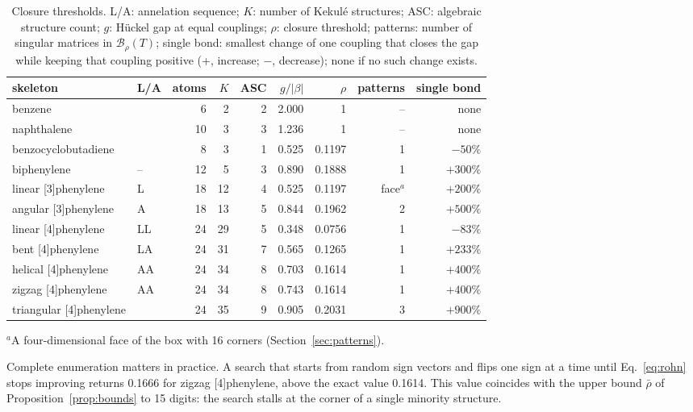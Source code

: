 \documentclass[11pt]{article}
\newcommand{\Bx}{\mathcal{B}}
\begin{document}
\begin{table}[t]
\centering
\caption{Closure thresholds. L/A: annelation sequence; $K$: number of Kekul\'e structures; ASC: algebraic structure count; $g$: H\"uckel gap at equal couplings; $\rho$: closure threshold; patterns: number of singular matrices in $\Bx_\rho(T)$; single bond: smallest change of one coupling that closes the gap while keeping that coupling positive (+, increase; $-$, decrease); none if no such change exists.}
\label{tab:rho}
\begin{tabular}{llrrrrrrr}
\toprule
skeleton & L/A & atoms & $K$ & ASC & $g/|\beta|$ & $\rho$ & patterns & single bond \\
\midrule
benzene & & 6 & 2 & 2 & 2.000 & 1 & -- & none \\
naphthalene & & 10 & 3 & 3 & 1.236 & 1 & -- & none \\
benzocyclobutadiene & & 8 & 3 & 1 & 0.525 & 0.1197 & 1 & $-50\%$ \\
biphenylene & -- & 12 & 5 & 3 & 0.890 & 0.1888 & 1 & $+300\%$ \\
linear [3]phenylene & L & 18 & 12 & 4 & 0.525 & 0.1197 & face$^{a}$ & $+200\%$ \\
angular [3]phenylene & A & 18 & 13 & 5 & 0.844 & 0.1962 & 2 & $+500\%$ \\
linear [4]phenylene & LL & 24 & 29 & 5 & 0.348 & 0.0756 & 1 & $-83\%$ \\
bent [4]phenylene & LA & 24 & 31 & 7 & 0.565 & 0.1265 & 1 & $+233\%$ \\
helical [4]phenylene & AA & 24 & 34 & 8 & 0.703 & 0.1614 & 1 & $+400\%$ \\
zigzag [4]phenylene & AA & 24 & 34 & 8 & 0.743 & 0.1614 & 1 & $+400\%$ \\
triangular [4]phenylene & & 24 & 35 & 9 & 0.905 & 0.2031 & 3 & $+900\%$ \\
\bottomrule
\end{tabular}

\smallskip
{\footnotesize $^{a}$A four-dimensional face of the box with 16 corners (Section~\ref{sec:patterns}).}
\end{table}

Complete enumeration matters in practice. A search that starts from random sign vectors and flips one sign at a time until Eq.~\eqref{eq:rohn} stops improving returns 0.1666 for zigzag [4]phenylene, above the exact value 0.1614. This value coincides with the upper bound $\bar\rho$ of Proposition~\ref{prop:bounds} to 15 digits: the search stalls at the corner of a single minority structure.
\end{document}
